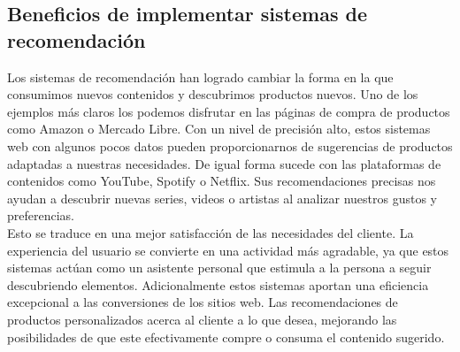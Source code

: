 \subsection{Beneficios de implementar sistemas de recomendación}
Los sistemas de recomendación han logrado cambiar la forma en la que consumimos nuevos contenidos y descubrimos productos nuevos. Uno de los ejemplos más claros los podemos disfrutar en las páginas de compra de productos como Amazon o Mercado Libre. Con un nivel de precisión alto, estos sistemas web con algunos pocos datos pueden proporcionarnos de sugerencias de productos adaptadas a nuestras necesidades. De igual forma sucede con las plataformas de contenidos como YouTube, Spotify o Netflix. Sus recomendaciones precisas nos ayudan a descubrir nuevas series, videos o artistas al analizar nuestros gustos y preferencias.\\
\newline
Esto se traduce en una mejor satisfacción de las necesidades del cliente. La experiencia del usuario se convierte en una actividad más agradable, ya que estos sistemas actúan como un asistente personal que estimula a la persona a seguir descubriendo elementos. Adicionalmente estos sistemas aportan una eficiencia excepcional a las conversiones de los sitios web. Las recomendaciones de productos personalizados acerca al cliente a lo que desea, mejorando las posibilidades de que este efectivamente compre o consuma el contenido sugerido. \cite{mc6}



